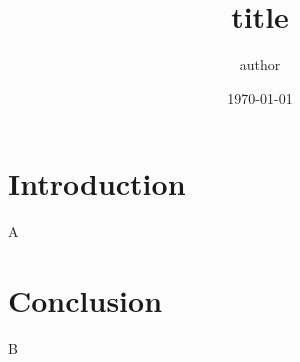 \documentclass{article}
\title{title}
\author{author}
\date{\today}
\begin{document}
\maketitle

\section{Introduction}
A

\section{Conclusion}
B
\end{document}
